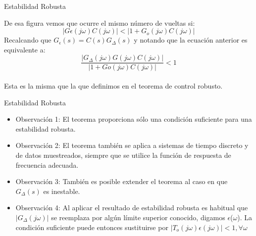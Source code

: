 \documentclass{beamer}
\begin{document}
\begin{frame}{Estabilidad Robusta}
\begin{justify}
\begin{itemize}
\justifying
De esa figura vemos que ocurre el mismo número de vueltas si:
\begin{equation}\label{sensibilidad3}
   \left |{ G{\epsilon}(j\omega)C(j\omega)}  \right |< \left |{ 1+ G_{o}(j\omega)C(j\omega)}  \right |
\end{equation}
Recalcando que $G_{\epsilon}(s)=C(s)G_{\Delta}(s)$ y notando que la ecuación anterior es equivalente a:
\begin{equation}\label{sensibilidad3}
   \frac{\left |{ G_{\Delta}(j\omega)G(j\omega)C(j\omega)}  \right |}{\left |{ 1+G{o}(j\omega)C(j\omega)}  \right |}<1 
\end{equation}
\\
Esta es la misma que la que definimos en el teorema de control robusto.
\end{itemize}
\end{justify}
\end{frame}

\begin{frame}{Estabilidad Robusta}
\begin{justify}
\begin{itemize}
\justifying
\item Observación 1: El teorema proporciona sólo una condición suficiente para una estabilidad robusta.
\item Observación 2: El teorema  también se aplica a sistemas de tiempo discreto y de datos muestreados, siempre que se utilice la función de respuesta de frecuencia adecuada.
\item Observación 3: También es posible extender el teorema al caso en que  $G_{\Delta }(s)$ es inestable.
\item Observación 4: Al aplicar el resultado de estabilidad robusta es habitual que $\left |G_{\Delta }(j\omega) \right |$ se reemplaza por algún límite superior conocido, digamos $\epsilon$($\omega$). La condición suficiente puede entonces sustituirse por $\left |T_{o}(j\omega)\epsilon(j\omega) \right |<1, \forall \omega$
\end{itemize}
\end{justify}
\end{frame}
\end{document}
